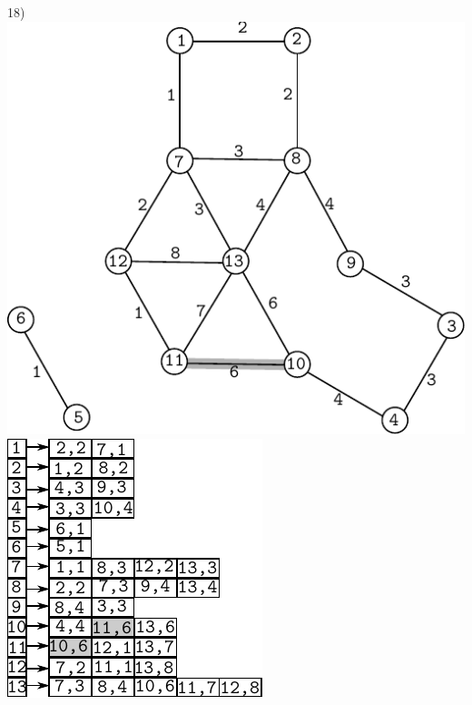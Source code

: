 \documentclass{article}
\begin{document}
\begin{center}
18)\includegraphics[scale=0.6]{bottleneck/g18}
\hspace{5mm}
\includegraphics[scale=0.9]{bottleneck/l18}
\end{center}
\end{document}
